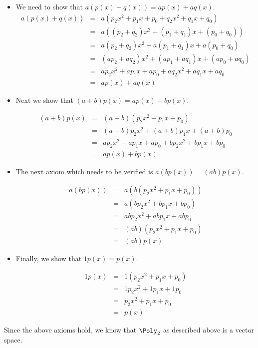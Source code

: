 \begin{solution}
\begin{itemize}
\item
We need to show that $a(p(x) + q(x)) = ap(x) + aq(x)$. 
\begin{eqnarray*}
a(p(x) + q(x)) &=& a (p_2x^2 + p_1x + p_0 + q_2x^2 + q_1x + q_0)\\
&=& a ((p_2+q_2)x^2 + (p_1+q_1)x + (p_0+q_0))\\
&=&  a(p_2+q_2)x^2  + a(p_1+q_1)x +  a(p_0 + q_0) \\
&=& (ap_2 + aq_2)x^2 + (ap_1+aq_1)x + (ap_0 + aq_0)  \\
&=&  ap_2x^2 + ap_1x + ap_0 + aq_2x^2 +aq_1x + aq_0\\
&=& ap(x) + aq(x) 
\end{eqnarray*}

\item
Next we show that $(a+b) p(x) = ap(x) + bp(x)$. 

\begin{eqnarray*} 
(a+b) p(x) &=& (a+b) ( p_2x^2 + p_1x + p_0)\\
&=& (a+b)p_2x^2 + (a+b)p_1x + (a+b)p_0   \\
&=&  ap_2x^2 + ap_1x + ap_0 + bp_2x^2 +bp_1x + bp_0\\
&=& ap(x) + bp(x)
\end{eqnarray*}

\item
The next axiom which needs to be verified is $a(bp(x)) = (ab)p(x)$. 

\begin{eqnarray*}
a(bp(x)) &=& a (b (p_2x^2 + p_1x +p_0)) \\
&=& a (bp_2x^2 +bp_1x + bp_0)\\
&=&  abp_2x^2 + abp_1x + abp_0 \\
&=& (ab) (p_2x^2 +p_1x + p_0)\\
&=& (ab) p(x) 
\end{eqnarray*}

\item 
Finally, we show that $1p(x) = p(x)$. 

\begin{eqnarray*}
1p(x) &=& 1 (p_2x^2  + p_1x +  p_0)\\
&=&  1p_2x^2 + 1p_1x + 1p_0\\
&=&  p_2x^2 + p_1x + p_0\\
&=& p(x)
\end{eqnarray*}

\end{itemize}

Since the above axioms hold, we know that $\Poly_2$ as described above is a vector space. 
\end{solution}


